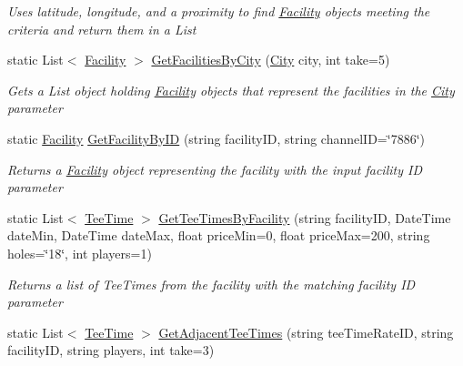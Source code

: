 \begin{DoxyCompactItemize}
\begin{DoxyCompactList}\small\item\em Uses latitude, longitude, and a proximity to find \mbox{\hyperlink{class_golf_now_a_p_i_1_1_facility}{Facility}} objects meeting the criteria and return them in a List \end{DoxyCompactList}\item 
static List$<$ \mbox{\hyperlink{class_golf_now_a_p_i_1_1_facility}{Facility}} $>$ \mbox{\hyperlink{class_golf_now_a_p_i_1_1_golf_now_a_p_i_handler_aaa4165dc6e7f348d02ba4dadfac977c3}{Get\+Facilities\+By\+City}} (\mbox{\hyperlink{class_golf_now_a_p_i_1_1_city}{City}} city, int take=5)
\begin{DoxyCompactList}\small\item\em Gets a List object holding \mbox{\hyperlink{class_golf_now_a_p_i_1_1_facility}{Facility}} objects that represent the facilities in the \mbox{\hyperlink{class_golf_now_a_p_i_1_1_city}{City}} parameter \end{DoxyCompactList}\item 
static \mbox{\hyperlink{class_golf_now_a_p_i_1_1_facility}{Facility}} \mbox{\hyperlink{class_golf_now_a_p_i_1_1_golf_now_a_p_i_handler_a138feb411a0ff70a56592cc27fc21871}{Get\+Facility\+By\+ID}} (string facility\+ID, string channel\+ID=\char`\"{}7886\char`\"{})
\begin{DoxyCompactList}\small\item\em Returns a \mbox{\hyperlink{class_golf_now_a_p_i_1_1_facility}{Facility}} object representing the facility with the input facility ID parameter \end{DoxyCompactList}\item 
static List$<$ \mbox{\hyperlink{class_golf_now_a_p_i_1_1_tee_time}{Tee\+Time}} $>$ \mbox{\hyperlink{class_golf_now_a_p_i_1_1_golf_now_a_p_i_handler_a706be4f71d1c4a8f34281a4c364c98a1}{Get\+Tee\+Times\+By\+Facility}} (string facility\+ID, Date\+Time date\+Min, Date\+Time date\+Max, float price\+Min=0, float price\+Max=200, string holes=\char`\"{}18\char`\"{}, int players=1)
\begin{DoxyCompactList}\small\item\em Returns a list of Tee\+Times from the facility with the matching facility ID parameter \end{DoxyCompactList}\item 
static List$<$ \mbox{\hyperlink{class_golf_now_a_p_i_1_1_tee_time}{Tee\+Time}} $>$ \mbox{\hyperlink{class_golf_now_a_p_i_1_1_golf_now_a_p_i_handler_a0b8fc4a17e1a9a19354d6d3639351578}{Get\+Adjacent\+Tee\+Times}} (string tee\+Time\+Rate\+ID, string facility\+ID, string players, int take=3)

\end{DoxyCompactItemize}

